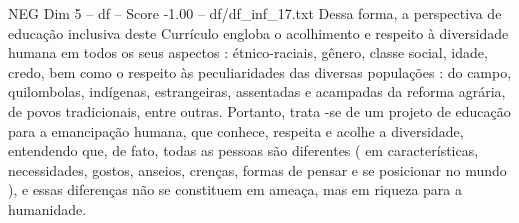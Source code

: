 \begin{textsample}{NEG Dim 5 – df – Score -1.00 – df/df\_inf\_17.txt}
Dessa forma, a perspectiva de educação inclusiva deste Currículo engloba o acolhimento e respeito à diversidade humana em todos os seus aspectos : étnico-raciais, gênero, classe social, idade, credo, bem como o respeito às peculiaridades das diversas populações : do campo, quilombolas, indígenas, estrangeiras, assentadas e acampadas da reforma agrária, de povos tradicionais, entre outras.
Portanto, trata -se de um projeto de educação para a emancipação humana, que conhece, respeita e acolhe a diversidade, entendendo que, de fato, todas as pessoas são diferentes ( em características, necessidades, gostos, anseios, crenças, formas de pensar e se posicionar no mundo ), e essas diferenças não se constituem em ameaça, mas em riqueza para a humanidade.

\end{textsample}
